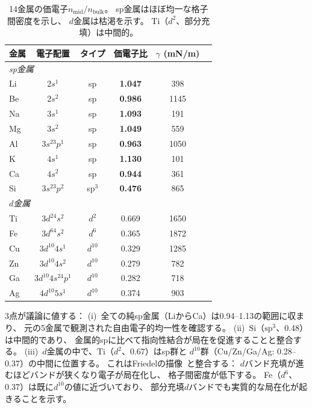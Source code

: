 \documentclass[twocolumn,showpacs,preprintnumbers,amsmath,amssymb,prb]{revtex4-2}
\begin{document}
\begin{table}[htb]
  \centering
  \caption{14金属の価電子$n_\mathrm{mid}/n_\mathrm{bulk}$。
    sp金属はほぼ均一な格子間密度を示し、
    $d$金属は枯渇を示す。
    Ti（$d^2$、部分充填）は中間的。}
  \label{tab:14metals}
  \begin{ruledtabular}
  \begin{tabular}{lccccc}
    金属 & 電子配置 & タイプ & 価電子比 & $\gamma$ (mN/m) \\
    \hline
    \multicolumn{5}{l}{\emph{sp金属}} \\
    Li  & $2s^1$         & sp    & \textbf{1.047} &  398 \\
    Be  & $2s^2$         & sp    & \textbf{0.986} & 1145 \\
    Na  & $3s^1$         & sp    & \textbf{1.093} &  191 \\
    Mg  & $3s^2$         & sp    & \textbf{1.049} &  559 \\
    Al  & $3s^23p^1$     & sp    & \textbf{0.963} & 1050 \\
    K   & $4s^1$         & sp    & \textbf{1.130} &  101 \\
    Ca  & $4s^2$         & sp    & \textbf{0.944} &  361 \\
    Si  & $3s^23p^2$     & sp$^3$ & \textbf{0.476} &  865 \\
    \hline
    \multicolumn{5}{l}{\emph{$d$金属}} \\
    Ti  & $3d^24s^2$     & $d^2$  & 0.669 & 1650 \\
    Fe  & $3d^64s^2$     & $d^6$  & 0.365 & 1872 \\
    Cu  & $3d^{10}4s^1$  & $d^{10}$ & 0.329 & 1285 \\
    Zn  & $3d^{10}4s^2$  & $d^{10}$ & 0.279 &  782 \\
    Ga  & $3d^{10}4s^24p^1$ & $d^{10}$ & 0.282 &  718 \\
    Ag  & $4d^{10}5s^1$  & $d^{10}$ & 0.374 &  903 \\
  \end{tabular}
  \end{ruledtabular}
\end{table}

3点が議論に値する：
(i)~全ての純sp金属（LiからCa）は0.94--1.13の範囲に収まり、
元の5金属で観測された自由電子的均一性を確認する。
(ii)~Si（$\mathrm{sp}^3$、0.48）は中間的であり、
金属的spに比べて指向性結合が局在を促進することと整合する。
(iii)~$d$金属の中で、Ti（$d^2$、0.67）はsp群と
$d^{10}$群（Cu/Zn/Ga/Ag: 0.28--0.37）の中間に位置する。
これはFriedelの描像~\cite{Friedel1969}と整合する：
$d$バンド充填が進むほどバンドが狭くなり電子が局在化し、
格子間密度が低下する。
Fe（$d^6$、0.37）は既に$d^{10}$の値に近づいており、
部分充填$d$バンドでも実質的な局在化が起きることを示す。
\end{document}
